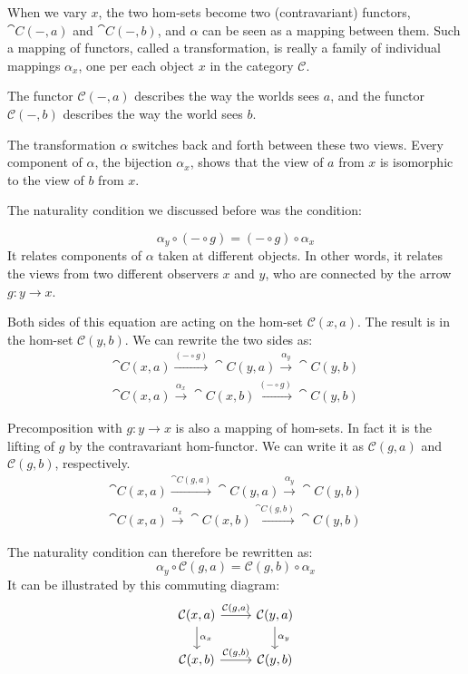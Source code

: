 \documentclass[DaoFP]{subfiles}
\begin{document}
When we vary $x$, the two hom-sets become two (contravariant) functors, $\cat C(-, a)$ and $\cat C(-, b)$, and $\alpha$ can be seen as a mapping between them. Such a mapping of functors, called a transformation, is really a family of individual mappings $\alpha_x$, one per each object $x$ in the category $\mathcal{C}$. 

The functor $\mathcal{C}(-, a)$ describes the way the worlds sees $a$, and the functor $\mathcal{C}(-, b)$ describes the way the world sees $b$. 

The transformation $\alpha$ switches back and forth between these two views. Every component of $\alpha$, the bijection $\alpha_x$, shows that the view of $a$ from $x$ is isomorphic to the view of $b$ from $x$. 

The naturality condition we discussed before was the condition:

\[ \alpha_y \circ (- \circ g) = (- \circ g) \circ \alpha_x \]
It relates components of $\alpha$ taken at different objects. In other words, it relates the views from two different observers $x$ and $y$, who are connected by the arrow $g \colon y \to x$. 

Both sides of this equation are acting on the hom-set $\mathcal{C}(x, a)$. The result is in the hom-set $\mathcal{C}(y, b)$. We can rewrite the two sides as:
\begin{align*}
 \cat C(x, a) \xrightarrow{(- \circ g)} \cat C(y, a) \xrightarrow{\alpha_y} \cat C(y, b) \\
\cat C(x, a) \xrightarrow{\alpha_x}  \cat C(x, b)  \xrightarrow{(- \circ g)}\cat C(y, b)
\end{align*}

Precomposition with $g \colon y \to x$ is also a mapping of hom-sets. In fact it is the lifting of $g$ by the contravariant hom-functor. We can write it as $\mathcal{C}(g, a)$ and $\mathcal{C}(g, b)$, respectively.
\begin{align*}
 \cat C(x, a) \xrightarrow{\cat C(g, a)} \cat C(y, a) \xrightarrow{\alpha_y} \cat C(y, b) \\
\cat C(x, a) \xrightarrow{\alpha_x}  \cat C(x, b)  \xrightarrow{\cat C(g, b)}\cat C(y, b)
\end{align*}

The naturality condition can therefore be rewritten as:
\[ \alpha_y \circ \mathcal{C}(g, a) = \mathcal{C}(g, b) \circ \alpha_x \]
It can be illustrated by this commuting diagram:
\[
 \begin{tikzcd}
 \mathcal{C}(x, a)
 \arrow[d, "\alpha_x"]
 \arrow[r, "{\mathcal{C}(g, a)}"]
 &
 \mathcal{C}(y, a)
  \arrow[d, "\alpha_y"]
 \\
 \mathcal{C}(x, b)
 \arrow[r, "{\mathcal{C}(g, b)}"]
& \mathcal{C}(y, b)
 \end{tikzcd}
\]
\end{document}
